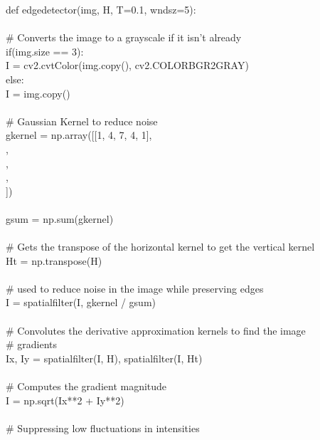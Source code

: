 \documentclass{article}
\begin{document}
	\noindent def edge\textunderscore detector(img, H, T=0.1, wndsz=5):\\
	\\
	\indent \# Converts the image to a grayscale if it isn't already\\
	\indent if(img.size == 3):\\
	\indent \indent I = cv2.cvtColor(img.copy(), cv2.COLOR\textunderscore BGR2GRAY)\\
	\indent else:\\
	\indent \indent I = img.copy()\\
	\\
	\indent \# Gaussian Kernel to reduce noise\\
	\indent g\textunderscore kernel = np.array([[1, 4, 7, 4, 1],\\
	\indent \indent [4, 20, 33, 20, 4],\\
	\indent \indent [7, 33, 55, 33, 7],\\
	\indent \indent [4, 20, 33, 20, 4],\\
	\indent \indent [1, 4, 7, 4, 1]])\\
	\\
	\indent g\textunderscore sum = np.sum(g\textunderscore kernel)  \\ 
	\\
	\indent \# Gets the transpose of the horizontal kernel to get the vertical kernel\\
	\indent H\textunderscore t = np.transpose(H)\\
	\\
	\indent \# used to reduce noise in the image while preserving edges\\
	\indent I = spatial\textunderscore filter(I, g\textunderscore kernel / g\textunderscore sum) \\ 
	\\
	\indent \# Convolutes the derivative approximation kernels to find the image \\
	\indent \# gradients\\
	\indent I\textunderscore x, I\textunderscore y = spatial\textunderscore filter(I, H), spatial\textunderscore filter(I, H\textunderscore t)\\
	\\
	\indent \# Computes the gradient magnitude\\
	\indent I = np.sqrt(I\textunderscore x**2 + I\textunderscore y**2)\\
	  \\
	\indent \# Suppressing low fluctuations in intensities\\
\end{document}

